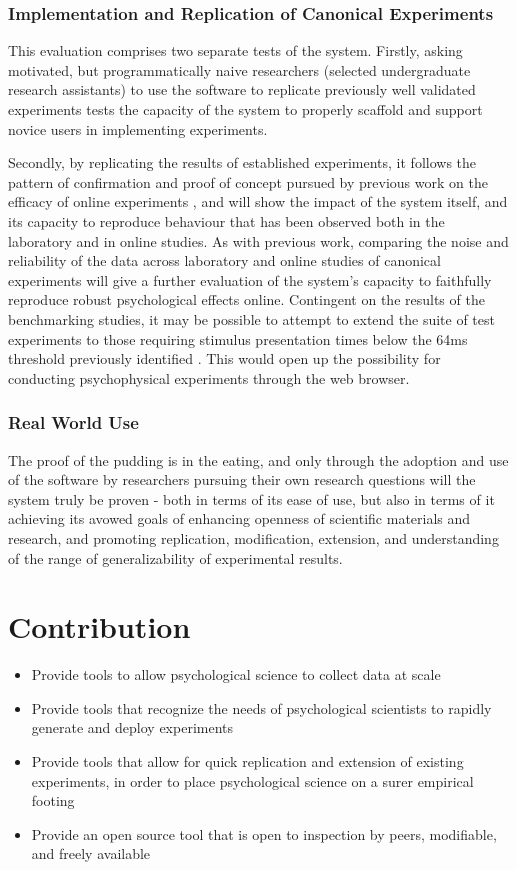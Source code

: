 \documentclass[12pt,a4paper,titlepage]{scrreprt}
\begin{document}
\subsection{Implementation and Replication of Canonical Experiments}
This evaluation comprises two separate tests of the system. Firstly, asking motivated, but programmatically naive researchers (selected undergraduate research assistants) to use the software to replicate previously well validated experiments tests the capacity of the system to properly scaffold and support novice users in implementing experiments.

Secondly, by replicating the results of established experiments, it follows the pattern of confirmation and proof of concept pursued by previous work on the efficacy of online experiments \parencite{germine_is_2012,crump_evaluating_2013}, and will show the impact of the system itself, and its capacity to reproduce behaviour that has been observed  both in the laboratory and in online studies. As with previous work, comparing the noise and reliability of the data across laboratory and online studies of canonical experiments will give a further evaluation of the system's capacity to faithfully reproduce robust psychological effects online.
Contingent on the results of the benchmarking studies, it may be possible to attempt to extend the suite of test experiments to those requiring stimulus presentation times below the 64ms threshold previously identified \parencite{crump_evaluating_2013}. This would open up the possibility for conducting psychophysical experiments through the web browser.
\subsection{Real World Use}
The proof of the pudding is in the eating, and only through the adoption and use of the software by researchers pursuing their own research questions will the system truly be proven - both in terms of its ease of use, but also in terms of it achieving its avowed goals of enhancing openness of scientific materials and research, and promoting replication, modification, extension, and understanding of the range of generalizability of experimental results.
\chapter{Contribution}
\begin{itemize}
\item Provide tools to allow psychological science to collect data at scale
\item Provide tools that recognize the needs of psychological scientists to rapidly generate and deploy experiments
\item Provide tools that allow for quick replication and extension of existing experiments, in order to place psychological science on a surer empirical footing
\item Provide an open source tool that is open to inspection by peers, modifiable, and freely available
\end{itemize}
\printbibliography
\end{document}
